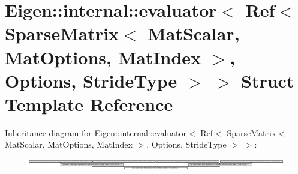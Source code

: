 \hypertarget{struct_eigen_1_1internal_1_1evaluator_3_01_ref_3_01_sparse_matrix_3_01_mat_scalar_00_01_mat_opti1f146c69a21d0c41f4f1c116a0c5fce2}{}\section{Eigen\+:\+:internal\+:\+:evaluator$<$ Ref$<$ Sparse\+Matrix$<$ Mat\+Scalar, Mat\+Options, Mat\+Index $>$, Options, Stride\+Type $>$ $>$ Struct Template Reference}
\label{struct_eigen_1_1internal_1_1evaluator_3_01_ref_3_01_sparse_matrix_3_01_mat_scalar_00_01_mat_opti1f146c69a21d0c41f4f1c116a0c5fce2}
Inheritance diagram for Eigen\+:\+:internal\+:\+:evaluator$<$ Ref$<$ Sparse\+Matrix$<$ Mat\+Scalar, Mat\+Options, Mat\+Index $>$, Options, Stride\+Type $>$ $>$\+:\begin{figure}[H]
\begin{center}
\leavevmode
\includegraphics[height=0.500000cm]{struct_eigen_1_1internal_1_1evaluator_3_01_ref_3_01_sparse_matrix_3_01_mat_scalar_00_01_mat_opti1f146c69a21d0c41f4f1c116a0c5fce2}
\end{center}
\end{figure}
